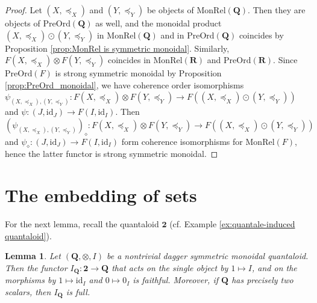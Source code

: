 \documentclass[12pt]{tac}
\newtheorem{lemma}[theorem]{Lemma}
\theoremstyle{definition}
\theoremstyle{remark}
\newcommand{\qo}{{\boldsymbol{\preccurlyeq}}}
\newcommand{\<}{\langle}
\renewcommand{\>}{\rangle}
\renewcommand{\:}{\colon}
\newcommand{\id}{\mathrm{id}}
\begin{document}
\begin{proof}
Let $(X,\qo_X)$ and $(Y,\qo_Y)$ be objects of $\mathrm{MonRel}(\mathbf Q)$. Then they are objects of $\mathrm{PreOrd}(\mathbf Q)$ as well, and the monoidal product $(X,\qo_X)\odot(Y,\qo_Y)$ in $\mathrm{MonRel}(\mathbf Q)$ and in $\mathrm{PreOrd}(\mathbf Q)$ coincides by Proposition \ref{prop:MonRel is symmetric monoidal}. Similarly, $F(X,\qo_X)\otimes F(Y,\qo_Y)$ coincides in $\mathrm{MonRel}(\mathbf R)$ and $\mathrm{PreOrd}(\mathbf R)$. Since $\mathrm{PreOrd}(F)$ is strong symmetric monoidal by Proposition \ref{prop:PreOrd_monoidal}, we have coherence order isomorphisms $\psi_{(X,\qo_X),(Y,\qo_Y)}:F(X,\qo_X)\otimes F(Y,\qo_Y)\to F((X,\qo_X)\odot (Y,\qo_Y))$ and $\psi:(J,\id_J)\to F(I,\id_I)$. Then $(\psi_{(X,\qo_X),(Y,\qo_Y)})_\diamond:F(X,\qo_X)\otimes F(Y,\qo_Y)\to F((X,\qo_X)\odot (Y,\qo_Y))$ and $\psi_\diamond:(J,\id_J)\to F(I,\id_I)$ form coherence isomorphisms for $\mathrm{MonRel}(F)$, hence the latter functor is strong symmetric monoidal.
\end{proof}






\section{The embedding of sets}\label{sec:embedding-sets}


For the next lemma, recall the quantaloid $\mathbf 2$ (cf. Example \ref{ex:quantale-induced quantaloid}).

\begin{lemma}\label{lem:IQ}
Let $(\mathbf Q,\otimes,I)$ be a nontrivial dagger symmetric monoidal quantaloid. Then the functor $I_\mathbf Q:\mathbf 2\to\mathbf Q$ that acts on the single object by $1\mapsto I$, and on the morphisms by $1\mapsto \id_I$ and $0\mapsto 0_I$ is faithful. Moreover, if $\mathbf Q$ has precisely two scalars, then $I_\mathbf Q$ is full.
\end{lemma}
\end{document}
